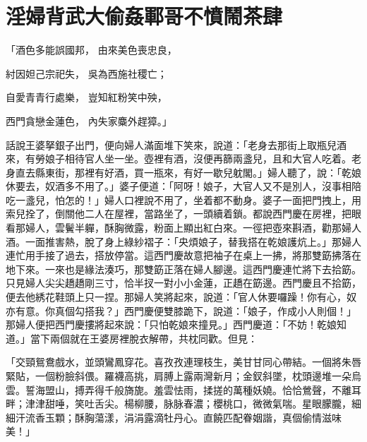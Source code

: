 %

\chapter{淫婦背武大偷姦\KG 鄆哥不憤鬧茶肆}

「酒色多能誤國邦，  由來美色喪忠良，

紂因妲己宗祀失，  吳為西施社稷亡；

自愛青青行處樂，  豈知紅粉笑中殃，

西門貪戀金蓮色，  內失家麋外趕獐。」

話說王婆拏銀子出門，便向婦人滿面堆下笑來，說道：「老身去那街上取瓶兒酒來，有勞娘子相待官人坐一坐。壺裡有酒，沒便再篩兩盞兒，且和大官人吃着。老身直去縣東街，那裡有好酒，買一瓶來，有好一歇兒躭閣。」婦人聽了，說：「乾娘休要去，奴酒多不用了。」婆子便道：「阿呀！娘子，大官人又不是別人，沒事相陪吃一盞兒，怕怎的！」婦人口裡說不用了，坐着都不動身。婆子一面把門拽上，用索兒拴了，倒關他二人在屋裡，當路坐了，一頭續着鎖。都說西門慶在房裡，把眼看那婦人，雲鬢半軃，酥胸微露，粉面上顯出紅白來。一徑把壺來斟酒，勸那婦人酒。一面推害熱，脫了身上綠紗褶子：「央煩娘子，替我搭在乾娘護炕上。」那婦人連忙用手接了過去，搭放停當。這西門慶故意把袖子在桌上一拂，將那雙筯拂落在地下來。一來也是緣法湊巧，那雙筯正落在婦人腳邊。這西門慶連忙將下去拾筯。只見婦人尖尖趫趫剛三寸，恰半扠一對小小金蓮，正趫在筯邊。西門慶且不拾筯，便去他綉花鞋頭上只一捏。那婦人笑將起來，說道：「官人休要囉躁！你有心，奴亦有意。你真個勾搭我？」西門慶便雙膝跪下，說道：「娘子，作成小人則個！」那婦人便把西門慶摟將起來說：「只怕乾娘來撞見。」西門慶道：「不妨！乾娘知道。」當下兩個就在王婆房裡脫衣解帶，共枕同歡。但見：

「交頸鴛鴦戲水，並頭鸞鳳穿花。喜孜孜連理枝生，美甘甘同心帶結。一個將朱唇緊貼，一個粉臉斜偎。羅襪高挑，肩膊上露兩灣新月；金釵斜墜，枕頭邊堆一朵烏雲。誓海盟山，搏弄得千般旖旎。羞雲怯雨，揉搓的萬種妖嬈。恰恰鶯聲，不離耳畔；津津甜唾，笑吐舌尖。楊柳腰，脉脉春濃；櫻桃口，微微氣喘。星眼朦朧，細細汗流香玉顆；酥胸蕩漾，涓涓露滴牡丹心。直饒匹配眷姻諧，真個偷情滋味美！」

